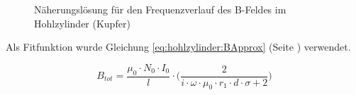 \clearpage
%		
%
%

\begin{figure}[h!]
    \resizebox{\textwidth}{!}{}
    \caption{N\"aherungsl\"osung f\"ur den Frequenzverlauf des B-Feldes im Hohlzylinder (Kupfer)}
    \label{fig:cu:freq:approx}
\end{figure}

\begin{minipage}[t][][t]{0.43\textwidth}
    
\end{minipage}
\begin{minipage}[t][][t]{0.56\textwidth}

    Als  Fitfunktion  wurde   Gleichung  \ref{eq:hohlzylinder:BApprox}  (Seite
    \pageref{eq:hohlzylinder:BApprox}) verwendet.

    \begin{equation*}
        B_{tot} = \frac{\mu_0 \cdot N_0 \cdot I_0}{l} \cdot \Biggl( \frac{2}{i \cdot \omega \cdot \mu_0 \cdot r_1 \cdot d \cdot \sigma + 2} \Biggr)
    \end{equation*}

\end{minipage}

